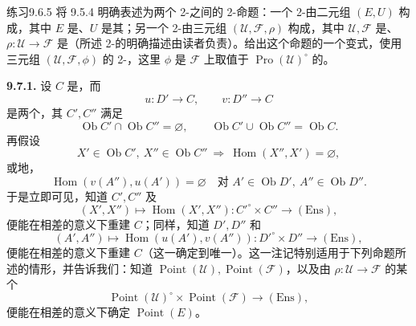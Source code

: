 \begin{SGAresult}{练习}{9.6.5}
将 9.5.4 明确表述为两个 2-之间的 2-命题：一个 2-由二元组 $(E,U)$ 构成，其中 $E$ 是、$U$ 是其；另一个 2-由三元组 $(\mathscr U,\mathscr F,\rho)$ 构成，其中 $\mathscr U,\mathscr F$ 是、$\rho:\mathscr U\to\mathscr F$ 是（所述 2-的明确描述由读者负责）。给出这个命题的一个变式，使用三元组 $(\mathscr U,\mathscr F,\phi)$ 的 2-，这里 $\phi$ 是 $\mathscr F$ 上取值于 $\operatorname{Pro}(\mathscr U)^\circ$ 的。
\end{SGAresult}
\textbf{9.7.1.} 设 $C$ 是，而
\[
u:D'\longrightarrow C,\qquad v:D''\longrightarrow C
\]
是两个，其 $C',C''$ 满足
\[
\operatorname{Ob}C'\cap\operatorname{Ob}C''=\varnothing,\qquad
\operatorname{Ob}C'\cup\operatorname{Ob}C''=\operatorname{Ob}C.
\]
再假设
\[
X'\in\operatorname{Ob}C',\ X''\in\operatorname{Ob}C''\ \Longrightarrow\ \operatorname{Hom}(X'',X')=\varnothing,
\]
或地，
\[
\operatorname{Hom}(v(A''),u(A'))=\varnothing\quad\text{对 }A'\in\operatorname{Ob}D',\ A''\in\operatorname{Ob}D''.
\]
于是立即可见，知道 $C',C''$ 及
\[
(X',X'')\longmapsto\operatorname{Hom}(X',X''):C'^\circ\times C''\longrightarrow(\mathrm{Ens}),
\]
便能在相差的意义下重建 $C$；同样，知道 $D',D''$ 和
\[
(A',A'')\longmapsto\operatorname{Hom}(u(A'),v(A'')):D'^\circ\times D''\longrightarrow(\mathrm{Ens}),
\]
便能在相差的意义下重建 $C$（这一确定到唯一）。这一注记特别适用于下列命题所述的情形，并告诉我们：知道 $\operatorname{Point}(\mathscr U),\operatorname{Point}(\mathscr F)$，以及由 $\rho:\mathscr U\to\mathscr F$ 的某个
\[
\operatorname{Point}(\mathscr U)^\circ\times\operatorname{Point}(\mathscr F)\longrightarrow(\mathrm{Ens}),
\]
便能在相差的意义下确定 $\operatorname{Point}(E)$。

